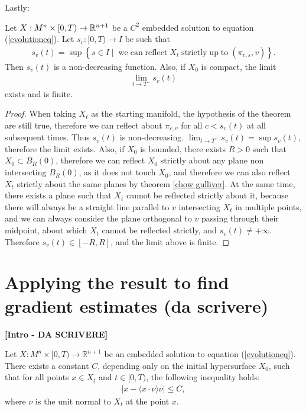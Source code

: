 Lastly: 
\begin{cor}
	Let $X:M^n\times [0,T) \rightarrow \mathbb{R}^{n+1}$ be a $C^2$ embedded solution to  equation (\ref{evolutioneq}). Let $s_v:[0,T) \rightarrow I$ be such that 
	\begin{align*}
		s_v(t)= \sup\left\{s \in I \;|\;  \; \mathrm{we \; can \; reflect \;} X_t \mathrm{ \; strictly \; up \; to }\; (\pi_{v, s}, v) \right\}.
	\end{align*}
	Then $s_v(t)$ is a non-decreasing function. Also, if $X_0$ is compact, the limit
	\begin{align*}
		\lim_{t\rightarrow T^-} s_v(t)
	\end{align*}
	exists and is finite.
\end{cor}
\begin{proof}
	When taking $X_t$ as the starting manifold, the hypothesis of the theorem are still true, therefore we can reflect about $\pi_{c, v}$  for all $c<s_v(t)$ at all subsequent times. Thus $s_v(t)$ is non-decreasing. $\lim_{t\rightarrow T^-} s_v(t) = \sup s_v(t)$, therefore the limit exists. Also, if $X_0$ is bounded, there exists $R>0$ such that $X_0\subset B_R(0)$, therefore we can reflect $X_0$ strictly about any plane non intersecting $B_R(0)$, as it does not touch $X_0$, and therefore we can also reflect $X_t$ strictly about the same planes by theorem \ref{chow gulliver}. At the same time, there exists a plane such that $X_t$ cannot be reflected strictly about it, because there will always be a straight line parallel to $v$ intersecting $X_t$ in multiple points, and we can always consider the plane orthogonal to $v$ passing through their midpoint, about which $X_t$ cannot be reflected strictly, and $s_v(t) \neq +\infty$. Therefore  $s_v(t)\in [-R, R]$, and the limit above is finite. 
\end{proof}


\section{Applying the result to find gradient estimates (da scrivere)}

{\LARGE \textbf{[Intro - DA SCRIVERE]}}

\begin{cor}
	Let $ X : M^n \times [0, T) \to \mathbb{R}^{n+1} $ be an embedded solution to equation (\ref{evolutioneq}). There exists a constant $ C $, depending only on the initial hypersurface $ X_0 $, such that for all points $ x \in X_t $ and $ t \in [0, T) $, the following inequality holds:
	\begin{align*}
		| x - \langle x \cdot \nu\rangle \nu | \leq C,
	\end{align*}
	where $ \nu $ is the unit normal to $ X_t $ at the point $ x $.
	\label{x projection estimate}
\end{cor}


